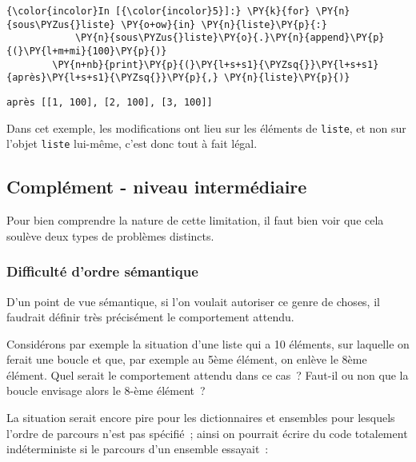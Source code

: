     \begin{Verbatim}[commandchars=\\\{\},frame=single,framerule=0.3mm,rulecolor=\color{cellframecolor}]
{\color{incolor}In [{\color{incolor}5}]:} \PY{k}{for} \PY{n}{sous\PYZus{}liste} \PY{o+ow}{in} \PY{n}{liste}\PY{p}{:}
            \PY{n}{sous\PYZus{}liste}\PY{o}{.}\PY{n}{append}\PY{p}{(}\PY{l+m+mi}{100}\PY{p}{)}
        \PY{n+nb}{print}\PY{p}{(}\PY{l+s+s1}{\PYZsq{}}\PY{l+s+s1}{après}\PY{l+s+s1}{\PYZsq{}}\PY{p}{,} \PY{n}{liste}\PY{p}{)}
\end{Verbatim}


    \begin{Verbatim}[commandchars=\\\{\},frame=single,framerule=0.3mm,rulecolor=\color{cellframecolor}]
après [[1, 100], [2, 100], [3, 100]]
\end{Verbatim}

    Dans cet exemple, les modifications ont lieu sur les éléments de
\texttt{liste}, et non sur l'objet \texttt{liste} lui-même, c'est donc
tout à fait légal.

    \hypertarget{compluxe9ment---niveau-intermuxe9diaire}{%
\subsection{Complément - niveau
intermédiaire}\label{compluxe9ment---niveau-intermuxe9diaire}}

    Pour bien comprendre la nature de cette limitation, il faut bien voir
que cela soulève deux types de problèmes distincts.

    \hypertarget{difficultuxe9-dordre-suxe9mantique}{%
\subsubsection{Difficulté d'ordre
sémantique}\label{difficultuxe9-dordre-suxe9mantique}}

    D'un point de vue sémantique, si l'on voulait autoriser ce genre de
choses, il faudrait définir très précisément le comportement attendu.

Considérons par exemple la situation d'une liste qui a 10 éléments, sur
laquelle on ferait une boucle et que, par exemple au 5ème élément, on
enlève le 8ème élément. Quel serait le comportement attendu dans ce
cas~? Faut-il ou non que la boucle envisage alors le 8-ème élément~?

La situation serait encore pire pour les dictionnaires et ensembles pour
lesquels l'ordre de parcours n'est pas spécifié~; ainsi on pourrait
écrire du code totalement indéterministe si le parcours d'un ensemble
essayait~:

